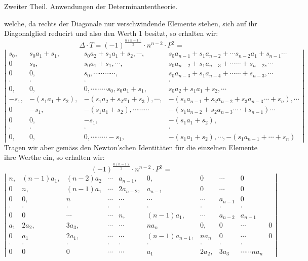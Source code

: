 \documentclass[11pt]{article}
\providecommand{\weberpage}[1]{}
\let\Delta\varDelta
\begin{document}


\weberpage{190}

Zweiter Theil. Anwendungen der Determinantentheorie.

welche, da rechts der Diagonale nur verschwindende Elemente stehen, sich auf ihr Diagonalglied reducirt und also den Werth 1 besitzt, so erhalten wir:
\[
\Delta \cdot T = (-1)^{\frac{n(n-1)}{2}} \cdot n^{n-2} \cdot P^2 =
\]
\[
\left|
\begin{array}{ccccc}
s_0, & s_0a_1+s_1, & s_0a_2+s_1a_1+s_2,\cdots, & s_0a_{n-1}+s_1a_{n-2}+\cdots s_{n-2}a_1+s_{n-1}\cdots \\
0 & s_0, & s_0a_1+s_1, \cdots, & s_0a_{n-2}+s_1a_{n-3}+\cdots\cdots+s_{n-2},\cdots \\
0 & 0, & s_0,\cdots\cdots\cdots\cdots, & s_0a_{n-3}+s_1a_{n-4}+\cdots\cdots+s_{n-3},\cdots \\
\cdot & \cdot & \cdot & \cdot \\
0, & 0, & 0,\cdots\cdots\cdots s_0, s_0a_1+s_1, & s_0a_2+s_1a_1+s_2,\cdots \\
-s_1, & -(s_1a_1+s_2), & -(s_1a_2+s_2a_1+s_3),\cdots, & -(s_1a_{n-1}+s_2a_{n-2}+s_3a_{n-3}\cdots+s_n),\cdots \\
0 & -s_1, & -(s_1a_1+s_2), \cdots\cdots\cdots & -(s_1a_{n-2}+s_2a_{n-3}\cdots\cdot+s_{n-1})\cdots \\
0 & 0, & -s_1, & -(s_1a_1+s_2), \\
\cdot & \cdot & \cdot & \cdot \\
0, & 0, & 0,\cdots\cdots\cdots-s_1, & -(s_1a_1+s_2),\cdots, -(s_1a_{n-1}+\cdots+s_n)
\end{array}
\right|
\]
Tragen wir aber gemäss den Newton'schen Identitäten für die einzelnen Elemente ihre Werthe ein, so erhalten wir:
\[
(-1)^{\frac{n(n-1)}{2}} \cdot n^{n-2} \cdot P^2 =
\]
\[
\left|
\begin{array}{cccccccccc}
n, & (n-1)a_1, & (n-2)a_2 & \cdots & a_{n-1}, & 0, & 0 & \cdots & 0 \\
0 & n, & (n-1)a_1 & \cdots & 2a_{n-2}, & a_{n-1} & 0 & \cdots & 0 \\
0 & 0, & n & \cdots & \cdots & \cdots & \cdots & a_{n-1} & 0 \\
\cdot & \cdot & \cdot & \cdot & \cdot & \cdot & \cdot & \cdot & \cdot \\
0 & 0 & \cdots & \cdots & n, & (n-1)a_1, & \cdots & a_{n-2} & a_{n-1} \\
a_1 & 2a_2, & 3a_3, & \cdots & \cdots & na_n & 0, & 0 & \cdots & 0 \\
0 & a_1 & 2a_1, & \cdots & \cdots & (n-1)a_{n-1}, & na_n & 0 & \cdots & 0 \\ %
\cdot & \cdot & \cdot & \cdot & \cdot & \cdot & \cdot & \cdot & \cdot \\
0 & 0 & 0 & \cdots & \cdots & a_1 & 2a_2, & 3a_3 & \cdots \cdots na_n
\end{array}
\right|
\]
\end{document}

